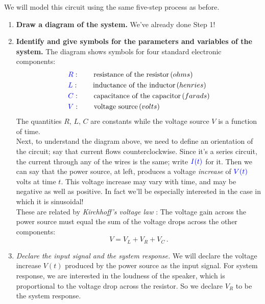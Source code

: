 We will model this circuit using the same five-step process as before.

\begin{enumerate}
\item \textbf{\color{blue} Draw a diagram of the system.} We've already done Step 1!
\item \textbf{\color{blue} Identify and give symbols for the parameters and variables of the system. }
  The diagram shows symbols for four standard electronic components:
  \begin{align*}
    &{\color{blue} R} : \qquad \text{resistance of the resistor}\, (ohms) \\
    &{\color{blue} L} : \qquad \text{inductance of the inductor}\, (henries) \\
    &{\color{blue} C} : \qquad \text{capacitance of the capacitor}\, (farads) \\
    &{\color{blue} V} : \qquad \text{voltage source}\, (volts)
  \end{align*}
  The quantities $R,\, L,\, C$ are constants while the voltage source $V$ is a function of time. \\

  Next, to understand the diagram above, we need to define an orientation of the circuit;
  say that current flows counterclockwise.
  Since it's a series circuit, the current through any of the wires is the same; write
  ${\color{blue}I(t)}$ for it.
  Then we can say that the power source, at left,
  produces a voltage \emph{increase} of ${\color{blue}V(t)}$ volts at time $t$.
  This voltage increase may vary with time, and may be negative as well as positive.
  In fact we'll be especially interested in the case in which it is sinusoidal! \\

  These are related by \emph{\color{blue} Kirchhoff's voltage law} :
  The voltage gain across the power source must equal
  the sum of the voltage drops across the other components:
  \begin{equation*}
    V=V_ L+V_ R+V_ C\, .
  \end{equation*}
  
\item \emph{\color{blue}Declare the input signal and the system response.}
  We will declare the voltage increase $V(t)$ produced by the power source as the input signal.
  For system response, we are interested in the loudness of the speaker,
  which is proportional to the voltage drop across the resistor.
  So we declare $V _R$ to be the system response. \\


\end{enumerate}
